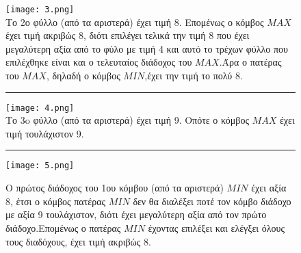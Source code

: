 \documentclass[10pt]{article}
\begin{document}
\begin{figure}[H]

    \texttt{[image: 3.png]}\\
    \caption{Το 2ο φύλλο (από τα αριστερά) έχει τιμή 8. Επομένως ο κόμβος $MAX$ έχει τιμή ακριβώς 8, διότι επιλέγει τελικά την τιμή 8 που έχει μεγαλύτερη αξία από το φύλο με τιμή 4 και αυτό το τρέχων φύλλο που επιλέχθηκε είναι και ο τελευταίος διάδοχος του $MAX$.Άρα ο πατέρας του $MAX$, δηλαδή ο κόμβος $MIN$,έχει την τιμή το πολύ 8.  }
    \begin{center}
        \rule{120mm}{0.2mm}
    \end{center}
    \texttt{[image: 4.png]}\\
    \caption{Το 3o φύλλο (από τα αριστερά) έχει τιμή 9. Οπότε ο κόμβος $MAX$ έχει τιμή τουλάχιστον 9.}
    \begin{center}
        \rule{120mm}{0.2mm}
    \end{center}
    
    \vspace{7mm}
    \texttt{[image: 5.png]}\\
    \caption{Ο πρώτος διάδοχος του 1ου κόμβου (από τα αριστερά) $MIN$ έχει αξία 8, έτσι ο κόμβος πατέρας $MIN$ δεν θα διαλέξει ποτέ τον κόμβο διάδοχο με αξία 9 τουλάχιστον, διότι έχει μεγαλύτερη αξία από τον πρώτο διάδοχο.Επομένως ο πατέρας $MIN$ έχοντας επιλέξει και ελέγξει όλους τους διαδόχους, έχει τιμή ακριβώς 8.}
    
\end{figure}
\end{document}
